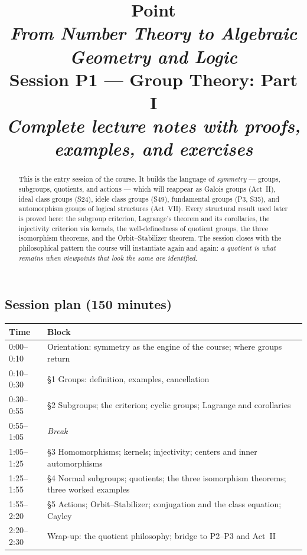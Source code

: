 \documentclass[11pt,a4paper]{article}
\title{
	{\color{blue!40!black}\textbf{\Huge Point}}\\[0.3em]
	\Large \textit{From Number Theory to Algebraic Geometry and Logic}\\[0.7em]
	\large \textbf{Session P1 --- Group Theory: Part I}\\[0.3em]
	\normalsize \emph{Complete lecture notes with proofs, examples, and exercises}
}
\author{}
\date{}
\theoremstyle{definition}
\begin{document}
	\maketitle
	\thispagestyle{empty}
	
	\begin{abstract}
		\noindent
		This is the entry session of the course. It builds the language of \emph{symmetry} --- groups,
		subgroups, quotients, and actions --- which will reappear as Galois groups (Act~II), ideal class
		groups (S24), idele class groups (S49), fundamental groups (P3, S35), and automorphism groups of
		logical structures (Act~VII). Every structural result used later is proved here: the subgroup
		criterion, Lagrange's theorem and its corollaries, the injectivity criterion via kernels, the
		well-definedness of quotient groups, the three isomorphism theorems, and the Orbit--Stabilizer
		theorem. The session closes with the philosophical pattern the course will instantiate again and
		again: \emph{a quotient is what remains when viewpoints that look the same are identified}.
	\end{abstract}
	
	\subsection*{Session plan (150 minutes)}
	\begin{center}\small
		\begin{tabular}{|l|l|}
			\hline
			\textbf{Time} & \textbf{Block} \\
			\hline
			0:00--0:10 & Orientation: symmetry as the engine of the course; where groups return \\
			0:10--0:30 & \S1 Groups: definition, examples, cancellation \\
			0:30--0:55 & \S2 Subgroups; the criterion; cyclic groups; Lagrange and corollaries \\
			0:55--1:05 & \emph{Break} \\
			1:05--1:25 & \S3 Homomorphisms; kernels; injectivity; centers and inner automorphisms \\
			1:25--1:55 & \S4 Normal subgroups; quotients; the three isomorphism theorems; three worked examples \\
			1:55--2:20 & \S5 Actions; Orbit--Stabilizer; conjugation and the class equation; Cayley \\
			2:20--2:30 & Wrap-up: the quotient philosophy; bridge to P2--P3 and Act~II \\
			\hline
		\end{tabular}
	\end{center}
	
\end{document}
